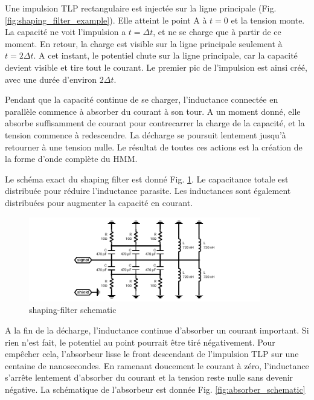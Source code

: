 Une impulsion TLP rectangulaire est injectée sur la ligne principale (Fig. \ref{fig:shaping_filter_example}).
Elle atteint le point A à $t=0$ et la tension monte.
La capacité ne voit l'impulsion a $t=\Delta t$, et ne se charge que à partir de ce moment.
En retour, la charge est visible sur la ligne principale seulement à $t=2\Delta t$.
A cet instant, le potentiel chute sur la ligne principale, car la capacité devient visible et tire tout le courant.
Le premier pic de l'impulsion est ainsi créé, avec une durée d'environ $2\Delta t$.

Pendant que la capacité continue de se charger, l'inductance connectée en parallèle commence à absorber du courant à son tour.
A un moment donné, elle absorbe suffisamment de courant pour contrecarrer la charge de la capacité, et la tension commence à redescendre.
La décharge se poursuit lentement jusqu'à retourner à une tension nulle.
Le résultat de toutes ces actions est la création de la forme d'onde complète du HMM.

Le schéma exact du shaping filter est donné Fig. \ref{fig:shaping_filter_schematic}.
Le capacitance totale est distribuée pour réduire l'inductance parasite.
Les inductances sont également distribuées pour augmenter la capacité en courant.

\begin{figure}[!h]
  \centering
  \includegraphics[width=0.9\textwidth]{src/1/figures/shaping_filter_schematic.pdf}
  \caption{shaping-filter schematic}
  \label{fig:shaping_filter_schematic}
\end{figure}

A la fin de la décharge, l'inductance continue d'absorber un courant important.
Si rien n'est fait, le potentiel au point pourrait être tiré négativement.
Pour empêcher cela, l'absorbeur lisse le front descendant de l'impulsion TLP sur une centaine de nanosecondes.
En ramenant doucement le courant à zéro, l'inductance s'arrête lentement d'absorber du courant et la tension reste nulle sans devenir négative.
La schématique de l'absorbeur est donnée Fig. \ref{fig:absorber_schematic}

